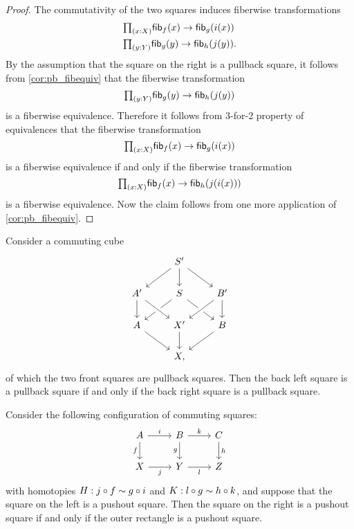 \begin{proof}
The commutativity of the two squares induces fiberwise transformations
\begin{align*}
& \prd{x:X}\fib{f}{x}\to \fib{g}{i(x)} \\
& \prd{y:Y}\fib{g}{y}\to \fib{h}{j(y)}.
\end{align*}
By the assumption that the square on the right is a pullback square, it follows from \cref{cor:pb_fibequiv} that the fiberwise transformation
\begin{equation*}
\prd{y:Y}\fib{g}{y}\to\fib{h}{j(y)}
\end{equation*}
is a fiberwise equivalence. Therefore it follows from 3-for-2 property of equivalences that the fiberwise transformation
\begin{equation*}
\prd{x:X}\fib{f}{x}\to\fib{g}{i(x)}
\end{equation*}
is a fiberwise equivalence if and only if the fiberwise transformation
\begin{equation*}
\prd{x:X}\fib{f}{x}\to\fib{h}{j(i(x))}
\end{equation*}
is a fiberwise equivalence. Now the claim follows from one more application of \cref{cor:pb_fibequiv}.
\end{proof}

\begin{cor}
Consider a commuting cube
\begin{equation*}
\begin{tikzcd}
& S' \arrow[dl] \arrow[dr] \arrow[d] \\
A' \arrow[d] & S \arrow[dl] \arrow[dr] & B' \arrow[dl,crossing over] \arrow[d] \\
A \arrow[dr] & X' \arrow[d] \arrow[from=ul,crossing over] & B \arrow[dl] \\
& X,
\end{tikzcd}
\end{equation*}
of which the two front squares are pullback squares. Then the back left square is a pullback square if and only if the back right square is a pullback square.
\end{cor}

\begin{prp}\label{thm:pushout_pasting}
Consider the following configuration of commuting squares:
\begin{equation*}
\begin{tikzcd}
A \arrow[r,"i"] \arrow[d,swap,"f"] & B \arrow[r,"k"] \arrow[d,swap,"g"] & C \arrow[d,"h"] \\
X \arrow[r,swap,"j"] & Y \arrow[r,swap,"l"] & Z
\end{tikzcd}
\end{equation*}
with homotopies $H:j\circ f\sim g\circ i$ and $K:l\circ g\sim h\circ k$, and suppose that the square on the left is a pushout square. 
Then the square on the right is a pushout square if and only if the outer rectangle is a pushout square.
\end{prp}

